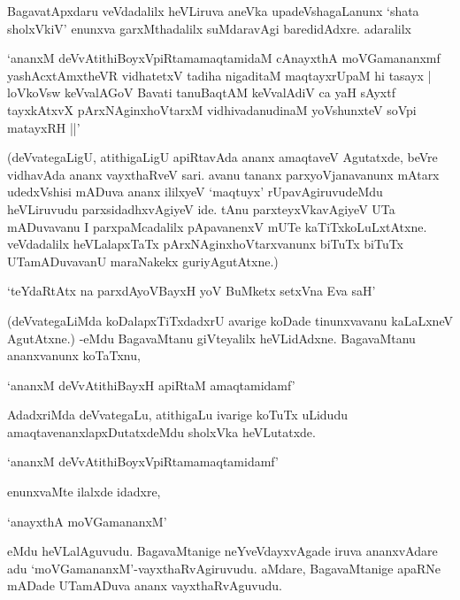 BagavatApxdaru veVdadalilx heVLiruva aneVka upadeVshagaLanunx `shata sholxVkiV' enunxva garxMthadalilx suMdaravAgi baredidAdxre. adaralilx

\begin{shloka}
`ananxM deVvAtithiBoyxV\s piRtamamaqtamidaM cAnayxthA moVGamananxmf\\
yashAcxtAmxtheVR vidhatetxV tadiha nigaditaM maqtayxrUpaM hi tasayx |\\
loVkoV\s sw keVvalAGoV Bavati tanuBaqtAM keVvalAdiV ca yaH sAyxtf\\
tayxkAtxvX pArxNAginxhoVtarxM vidhivadanudinaM yoV\s shunxteV soV\s pi matayxRH ||'
\end{shloka}

(deVvategaLigU, atithigaLigU apiRtavAda ananx amaqtaveV Agutatxde, beVre vidhavAda ananx vayxthaRveV sari. avanu tananx parxyoVjanavanunx mAtarx udedxVshisi mADuva ananx ililxyeV `maqtuyx' rUpavAgiruvudeMdu heVLiruvudu parxsidadhxvAgiyeV ide. tAnu parxteyxVkavAgiyeV UTa mADuvavanu I parxpaMcadalilx pApavanenxV mUTe kaTiTxkoLuLxtAtxne. veVdadalilx heVLalapxTaTx pArxNAginxhoVtarxvanunx biTuTx biTuTx UTamADuvavanU maraNakekx guriyAgutAtxne.)

\begin{shloka}
`teYdaRtAtx na parxdAyoVBayxH yoV BuMketx setxVna Eva saH'
\end{shloka}

(deVvategaLiMda koDalapxTiTxdadxrU avarige koDade tinunxvavanu kaLaLxneV AgutAtxne.) -eMdu BagavaMtanu giVteyalilx heVLidAdxne. BagavaMtanu ananxvanunx koTaTxnu,

\begin{shloka}
`ananxM deVvAtithiBayxH apiRtaM amaqtamidamf'
\end{shloka}

AdadxriMda deVvategaLu, atithigaLu ivarige koTuTx uLidudu amaqtavenanxlapxDutatxdeMdu sholxVka heVLutatxde.

\begin{shloka}
`ananxM deVvAtithiBoyxV\s piRtamamaqtamidamf'
\end{shloka}

enunxvaMte ilalxde idadxre,

\begin{shloka}
`anayxthA moVGamananxM'
\end{shloka}

\noindent eMdu heVLalAguvudu. BagavaMtanige neYveVdayxvAgade iruva ananxvAdare adu `moVGamananxM'-vayxthaRvAgiruvudu. aMdare, BagavaMtanige apaRNe mADade UTamADuva ananx vayxthaRvAguvudu.


